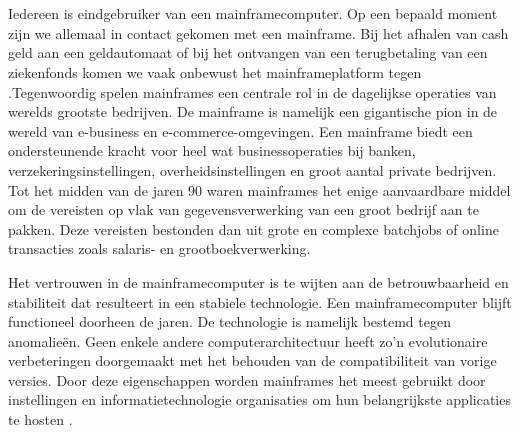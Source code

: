 \section{}

Iedereen is eindgebruiker van een mainframecomputer. Op een bepaald moment zijn we allemaal in contact gekomen met een mainframe. Bij het afhalen van cash geld aan een geldautomaat of bij het ontvangen van een terugbetaling van een ziekenfonds komen we vaak onbewust het mainframeplatform tegen \autocite{Ebbers2022}.Tegenwoordig spelen mainframes een centrale rol in de dagelijkse operaties van werelds grootste bedrijven. De mainframe is namelijk een gigantische pion in de wereld van e-business en e-commerce-omgevingen. Een mainframe biedt een ondersteunende kracht voor heel wat businessoperaties bij banken, verzekeringsinstellingen, overheidsinstellingen en groot aantal private bedrijven. Tot het midden van de jaren 90 waren mainframes het enige aanvaardbare middel om de vereisten op vlak van gegevensverwerking van een groot bedrijf aan te pakken. Deze vereisten bestonden dan uit grote en complexe batchjobs of online transacties zoals salaris- en grootboekverwerking.

Het vertrouwen in de mainframecomputer is te wijten aan de betrouwbaarheid en stabiliteit dat resulteert in een stabiele technologie. Een mainframecomputer blijft functioneel doorheen de jaren. De technologie is namelijk bestemd tegen anomalieën. Geen enkele andere computerarchitectuur heeft zo'n evolutionaire verbeteringen doorgemaakt met het behouden van de compatibiliteit van vorige versies. Door deze eigenschappen worden mainframes het meest gebruikt door instellingen en informatietechnologie organisaties om hun belangrijkste applicaties te hosten \autocite{Ebbers2022}. 

\newpage 

\section{}
\label{sec:probleemstelling}

